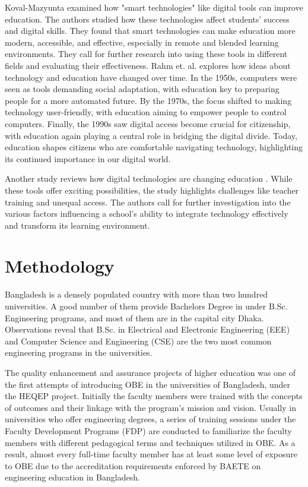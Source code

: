 \documentclass[journal,onecolumn]{IEEEtran}
\begin{document}
Koval-Mazyunta examined \cite{koval-mazyuta_information_2023} how "smart technologies" like digital tools can improve education. The authors studied how these technologies affect students' success and digital skills. They found that smart technologies can make education more modern, accessible, and effective, especially in remote and blended learning environments.  They call for further research into using these tools in different fields and evaluating their effectiveness. Rahm et. al. explores \cite{rahm_educational_2023} how ideas about technology and education have changed over time. In the 1950s, computers were seen as tools demanding social adaptation, with education key to preparing people for a more automated future. By the 1970s, the focus shifted to making technology user-friendly, with education aiming to empower people to control computers. Finally, the 1990s saw digital access become crucial for citizenship, with education again playing a central role in bridging the digital divide. Today, education shapes citizens who are comfortable navigating technology, highlighting its continued importance in our digital world.
\vspace{6pt}


Another study reviews how digital technologies are changing education \cite{timotheou_impacts_2023}.  While these tools offer exciting possibilities, the study highlights challenges like teacher training and unequal access.  The authors call for further investigation into the various factors influencing a school's ability to integrate technology effectively and transform its learning environment.

\section{\textbf{Methodology}}
Bangladesh is a densely populated country with more than two hundred universities. A good number of them provide Bachelors Degree in under B.Sc. Engineering programs, and most of them are in the capital city Dhaka. Observations reveal that B.Sc. in Electrical and Electronic Engineering (EEE) and Computer Science and Engineering (CSE) are the two most common engineering programs in the universities. 

The quality enhancement and assurance projects of higher education was one of the first attempts of introducing OBE in the universities of Bangladesh, under the HEQEP project. Initially the faculty members were trained with the concepts of outcomes and their linkage with the program's mission and vision. Usually in universities who offer engineering degrees, a series of training sessions under the Faculty Development Programs (FDP) are conducted to familiarize the faculty members with different pedagogical terms and techniques utilized in OBE. As a result, almost every full-time faculty member has at least some level of exposure to OBE due to the accreditation requirements enforced by BAETE on engineering education in Bangladesh. 
\vspace{6pt}
\end{document}
